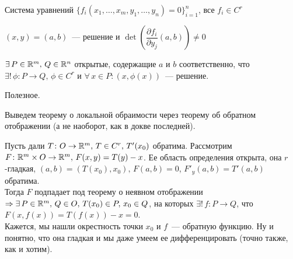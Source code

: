 \begin{NB*}
    Система уравнений $\{f_i(x_1,\ldots,x_m,y_1,\ldots,y_n)=0\}_{i=1}^n$, все $f_i\in C^r$
    
    $(x,y)=(a,b)$~--- решение и $\det\left(\dfrac{\partial f_i}{\partial y_j}(a,b)\right)\neq 0$
    
    \THEN $\exists\,P\in\rmy,\,Q\in\rmy[n]$ открытые, содержащие $a$ и $b$ соответственно, что $\exists!\,\phi\colon P\to Q,\,\phi\in C^r$ и $\forall\,x\in P: (x,\phi(x))$~--- решение.
    \end{NB*}

Полезное.

\begin{NB*}
    Выведем теорему о локальной обраимости через теорему об обратном отображении (а не наоборот, как в докве последней).
\end{NB*}
\begin{Proof}
    Пусть дали $T\colon O\to \rmy,\,T\in C^r,\,T'(x_0)$ обратима. Рассмотрим $F\colon \rmy\times O\to\rmy,\,F(x,y)=T(y)-x$. Ее область определения открыта, она $r$-гладкая, $(a,b)=(T(x_0),x_0),\,F(a,b)=0$, $F'_y(a,b)=T'(a,b)$ обратима.\\
    Тогда $F$ подпадает под теорему о неявном отображении $\Rightarrow\exists\,P\in\rmy,\,Q\in O,\,T(x_0)\in P,\,x_0\in Q$, на которых $\exists!\,f\colon P\to Q$, что $F(x,f(x))=T(f(x))-x=0$.\\
    Кажется, мы нашли окрестность точки $x_0$ и $f$~--- обратную функцию. Ну и понятно, что она гладкая и мы даже умеем ее дифференцировать (точно также, как и хотим).
\end{Proof}

